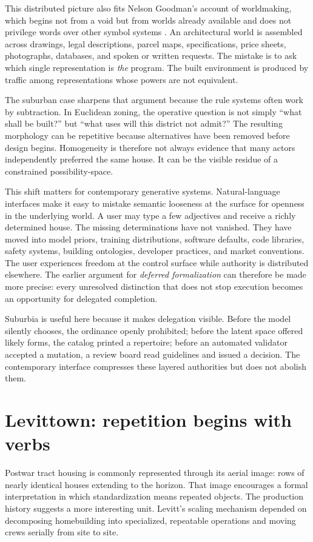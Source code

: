 \documentclass[11pt]{article}
\begin{document}
This distributed picture also fits Nelson Goodman's account of worldmaking, which begins not from a void but from worlds already available and does not privilege words over other symbol systems \citep{goodman1978ways}. An architectural world is assembled across drawings, legal descriptions, parcel maps, specifications, price sheets, photographs, databases, and spoken or written requests. The mistake is to ask which single representation is \emph{the} program. The built environment is produced by traffic among representations whose powers are not equivalent.

The suburban case sharpens that argument because the rule systems often work by subtraction. In Euclidean zoning, the operative question is not simply ``what shall be built?'' but ``what uses will this district not admit?'' The resulting morphology can be repetitive because alternatives have been removed before design begins. Homogeneity is therefore not always evidence that many actors independently preferred the same house. It can be the visible residue of a constrained possibility-space.

This shift matters for contemporary generative systems. Natural-language interfaces make it easy to mistake semantic looseness at the surface for openness in the underlying world. A user may type a few adjectives and receive a richly determined house. The missing determinations have not vanished. They have moved into model priors, training distributions, software defaults, code libraries, safety systems, building ontologies, developer practices, and market conventions. The user experiences freedom at the control surface while authority is distributed elsewhere. The earlier argument for \emph{deferred formalization} can therefore be made more precise: every unresolved distinction that does not stop execution becomes an opportunity for delegated completion.

Suburbia is useful here because it makes delegation visible. Before the model silently chooses, the ordinance openly prohibited; before the latent space offered likely forms, the catalog printed a repertoire; before an automated validator accepted a mutation, a review board read guidelines and issued a decision. The contemporary interface compresses these layered authorities but does not abolish them.

\section{Levittown: repetition begins with verbs}
Postwar tract housing is commonly represented through its aerial image: rows of nearly identical houses extending to the horizon. That image encourages a formal interpretation in which standardization means repeated objects. The production history suggests a more interesting unit. Levitt's scaling mechanism depended on decomposing homebuilding into specialized, repeatable operations and moving crews serially from site to site.
\end{document}
